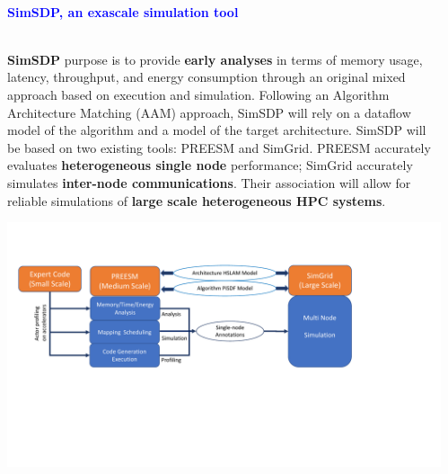 \documentclass{beamer}
\renewenvironment{block}[1]{%
\begin{Sbox}%
\begin{minipage}[t]{\textwidth}
~\\
\textcolor{blue}{\quad #1}~\\
~\\%
\vspace{0.5cm}
} 
{%
\end{minipage}
\end{Sbox}\Ovalbox{\TheSbox}%
}
\begin{document}
{\begin{columns}[t]
\begin{column}{.49\linewidth}
\footnotesize{
         \begin{minipage}{.99\textwidth}
        
  	\end{minipage}
  	}
\end{column}
\begin{column}{.49\linewidth}
\begin{block}{\large \textbf{SimSDP, an exascale simulation tool}}
 \begin{minipage}{0.95\textwidth}
 \textbf{SimSDP} purpose is to provide \textbf{early analyses} in terms of memory usage, latency, throughput, and energy consumption through an original mixed approach based on execution and simulation. Following an Algorithm Architecture Matching (AAM) approach, SimSDP will rely on a dataflow model of the algorithm and a model of the target architecture. SimSDP will be based on two existing tools: PREESM and SimGrid. PREESM accurately evaluates \textbf{heterogeneous single node} performance; SimGrid accurately simulates \textbf{inter-node communications}. Their association will allow for reliable simulations of \textbf{large scale heterogeneous HPC systems}.
 \\
 \begin{center}
    \includegraphics[width=\textwidth ]{SimSDP_overview} %
    \end{center}
 \end{minipage}
\end{block}



\end{column}
\end{columns}}
\end{document}

